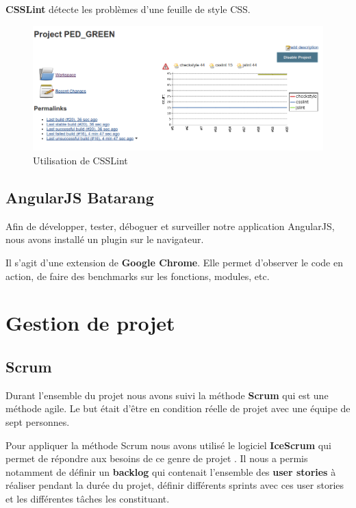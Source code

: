\documentclass [a4paper,11pt]{article}
\begin{document}
\textbf{CSSLint} détecte les problèmes d'une feuille de style CSS.

\begin{figure}[H]
\centering
\includegraphics[scale=0.4]{img/jslint.png}
\caption {Utilisation de CSSLint}
\end{figure}

\subsection{AngularJS Batarang}

Afin de développer, tester, déboguer et surveiller notre application AngularJS, nous avons installé un plugin sur le navigateur.\newline

Il s'agit d'une extension de \textbf{Google Chrome}. Elle permet d'observer le code en action, de faire des benchmarks sur les fonctions, modules, etc.

\newpage

\section{Gestion de projet}

\subsection{Scrum}

Durant l'ensemble du projet nous avons suivi la méthode \textbf{Scrum} qui est une méthode agile. Le but était d'être en condition réelle de projet avec une équipe de sept personnes. 
\newline

Pour appliquer la méthode Scrum nous avons utilisé le logiciel \textbf{IceScrum} qui permet de répondre aux besoins de ce genre de projet \cite{ICESCRUM}. Il nous a permis notamment de définir un \textbf{backlog} qui contenait l'ensemble des \textbf{user stories} à réaliser pendant la durée du projet, définir différents sprints avec ces user stories et les différentes tâches les constituant. 
\newline
\end{document}
